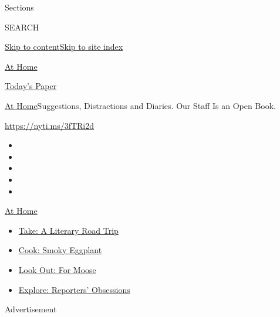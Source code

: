Sections

SEARCH

\protect\hyperlink{site-content}{Skip to
content}\protect\hyperlink{site-index}{Skip to site index}

\href{https://www.nytimes.com/spotlight/at-home}{At Home}

\href{https://myaccount.nytimes.com/auth/login?response_type=cookie\&client_id=vi}{}

\href{https://www.nytimes.com/section/todayspaper}{Today's Paper}

\href{/spotlight/at-home}{At Home}\textbar{}Suggestions, Distractions
and Diaries. Our Staff Is an Open Book.

\url{https://nyti.ms/3fTRi2d}

\begin{itemize}
\item
\item
\item
\item
\item
\end{itemize}

\href{https://www.nytimes.com/spotlight/at-home?action=click\&pgtype=Article\&state=default\&region=TOP_BANNER\&context=at_home_menu}{At
Home}

\begin{itemize}
\tightlist
\item
  \href{https://www.nytimes.com/2020/07/28/books/time-for-a-literary-road-trip.html?action=click\&pgtype=Article\&state=default\&region=TOP_BANNER\&context=at_home_menu}{Take:
  A Literary Road Trip}
\item
  \href{https://www.nytimes.com/2020/07/29/magazine/bored-with-your-home-cooking-some-smoky-eggplant-will-fix-that.html?action=click\&pgtype=Article\&state=default\&region=TOP_BANNER\&context=at_home_menu}{Cook:
  Smoky Eggplant}
\item
  \href{https://www.nytimes.com/2020/07/27/travel/moose-michigan-isle-royale.html?action=click\&pgtype=Article\&state=default\&region=TOP_BANNER\&context=at_home_menu}{Look
  Out: For Moose}
\item
  \href{https://www.nytimes.com/interactive/2020/at-home/even-more-reporters-editors-diaries-lists-recommendations.html?action=click\&pgtype=Article\&state=default\&region=TOP_BANNER\&context=at_home_menu}{Explore:
  Reporters' Obsessions}
\end{itemize}

Advertisement

